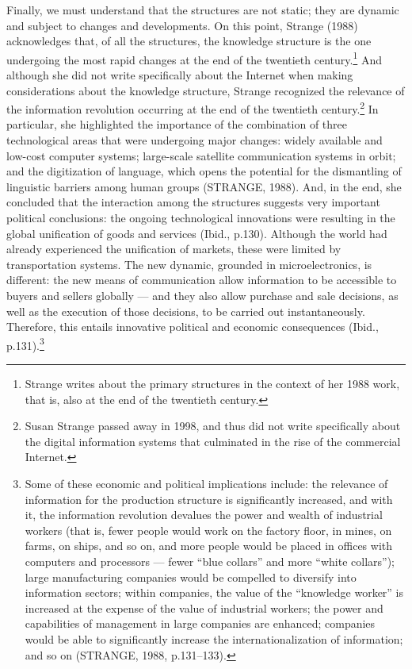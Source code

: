 Finally, we must understand that the structures are not static; they are dynamic and subject to changes and developments. On this point, Strange (1988) acknowledges that, of all the structures, the knowledge structure is the one undergoing the most rapid changes at the end of the twentieth century.\footnote{Strange writes about the primary structures in the context of her 1988 work, that is, also at the end of the twentieth century.} And although she did not write specifically about the Internet when making considerations about the knowledge structure, Strange recognized the relevance of the information revolution occurring at the end of the twentieth century.\footnote{Susan Strange passed away in 1998, and thus did not write specifically about the digital information systems that culminated in the rise of the commercial Internet.} In particular, she highlighted the importance of the combination of three technological areas that were undergoing major changes: widely available and low-cost computer systems; large-scale satellite communication systems in orbit; and the digitization of language, which opens the potential for the dismantling of linguistic barriers among human groups (STRANGE, 1988). And, in the end, she concluded that the interaction among the structures suggests very important political conclusions: the ongoing technological innovations were resulting in the global unification of goods and services (Ibid., p.130). Although the world had already experienced the unification of markets, these were limited by transportation systems. The new dynamic, grounded in microelectronics, is different: the new means of communication allow information to be accessible to buyers and sellers globally --- and they also allow purchase and sale decisions, as well as the execution of those decisions, to be carried out instantaneously. Therefore, this entails innovative political and economic consequences (Ibid., p.131).\footnote{Some of these economic and political implications include: the relevance of information for the production structure is significantly increased, and with it, the information revolution devalues the power and wealth of industrial workers (that is, fewer people would work on the factory floor, in mines, on farms, on ships, and so on, and more people would be placed in offices with computers and processors --- fewer ``blue collars'' and more ``white collars''); large manufacturing companies would be compelled to diversify into information sectors; within companies, the value of the ``knowledge worker'' is increased at the expense of the value of industrial workers; the power and capabilities of management in large companies are enhanced; companies would be able to significantly increase the internationalization of information; and so on (STRANGE, 1988, p.131--133).}

